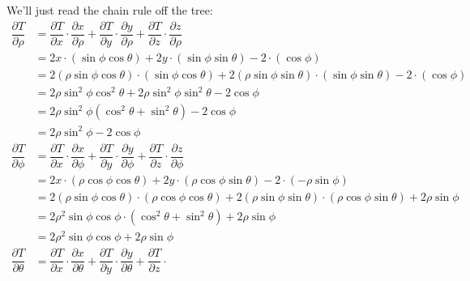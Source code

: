 \documentclass[10pt]{article}
\newenvironment{red}{\color{red}}{\ignorespacesafterend}
\begin{document}
\begin{enumerate}[leftmargin=0pt]
\begin{enumerate}
        \begin{red}
        We'll just read the chain rule off the tree:
        \begin{align*}
            \dfrac{\partial T}{\partial\rho} &= 
            \dfrac{\partial T}{\partial x}\cdot
            \dfrac{\partial x}{\partial\rho}
            + 
            \dfrac{\partial T}{\partial y}\cdot
            \dfrac{\partial y}{\partial\rho}
            + 
            \dfrac{\partial T}{\partial z}\cdot
            \dfrac{\partial z}{\partial\rho} \\
            &= 2x\cdot(\sin\phi\cos\theta) 
            + 2y\cdot(\sin\phi\sin\theta)
            -2\cdot(\cos\phi) \\
            &= 2(\rho\sin\phi\cos\theta)\cdot(\sin\phi\cos\theta) 
            + 2(\rho\sin\phi\sin\theta)\cdot(\sin\phi\sin\theta)
            -2\cdot(\cos\phi) \\
            &= 2\rho\sin^2\phi\cos^2\theta + 2\rho\sin^2\phi\sin^2\theta - 2\cos\phi \\
            &= 2\rho\sin^2\phi(\cos^2\theta+\sin^2\theta) - 2\cos\phi \\
            &= 2\rho\sin^2\phi-2\cos\phi
            \\
            \dfrac{\partial T}{\partial\phi} &= 
            \dfrac{\partial T}{\partial x}\cdot
            \dfrac{\partial x}{\partial\phi}
            + 
            \dfrac{\partial T}{\partial y}\cdot
            \dfrac{\partial y}{\partial\phi}
            + 
            \dfrac{\partial T}{\partial z}\cdot
            \dfrac{\partial z}{\partial\phi} \\
            &= 2x\cdot(\rho\cos\phi\cos\theta)
            + 2y\cdot(\rho\cos\phi\sin\theta)
            -2  \cdot(-\rho\sin\phi) \\
            &= 2(\rho\sin\phi\cos\theta)\cdot(\rho\cos\phi\cos\theta)
            + 2(\rho\sin\phi\sin\theta)\cdot(\rho\cos\phi\sin\theta)
            +2  \rho\sin\phi \\
            &= 2\rho^2\sin\phi\cos\phi \cdot (\cos^2\theta + \sin^2 \theta) + 2\rho\sin\phi \\
            &= 2\rho^2\sin\phi\cos\phi + 2\rho\sin\phi
            \\
            \dfrac{\partial T}{\partial\theta} &= 
            \dfrac{\partial T}{\partial x}\cdot
            \dfrac{\partial x}{\partial\theta}
            + 
            \dfrac{\partial T}{\partial y}\cdot
            \dfrac{\partial y}{\partial\theta}
            + 
            \dfrac{\partial T}{\partial z}\cdot

\end{align*}
\end{red}
\end{enumerate}
\end{enumerate}
\end{document}
